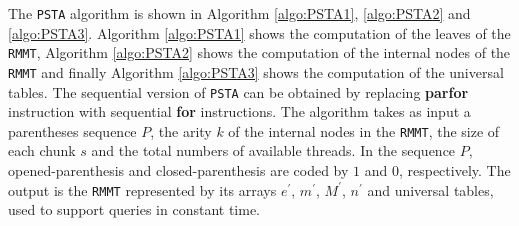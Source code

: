 The {\tt PSTA} algorithm is shown in Algorithm \ref{algo:PSTA1}, \ref{algo:PSTA2} and \ref{algo:PSTA3}. Algorithm \ref{algo:PSTA1} shows the computation of the leaves of the {\tt RMMT}, Algorithm \ref{algo:PSTA2} shows the computation of the internal nodes  of the {\tt RMMT} and finally Algorithm \ref{algo:PSTA3} shows the computation of the universal tables. The sequential version of {\tt PSTA} can be obtained by replacing {\bf parfor} instruction with sequential {\bf for} instructions. The algorithm takes as input a parentheses sequence $P$, the arity $k$ of the internal nodes in the {\tt RMMT}, the size of each chunk $s$ and the total numbers of available threads. In the sequence $P$, opened-parenthesis and closed-parenthesis are coded by $1$ and $0$, respectively. The output is the {\tt RMMT} represented by its arrays $e^{\prime}$, $m^{\prime}$, $M^{\prime}$, $n^{\prime}$ and universal tables, used to support queries in constant time.

